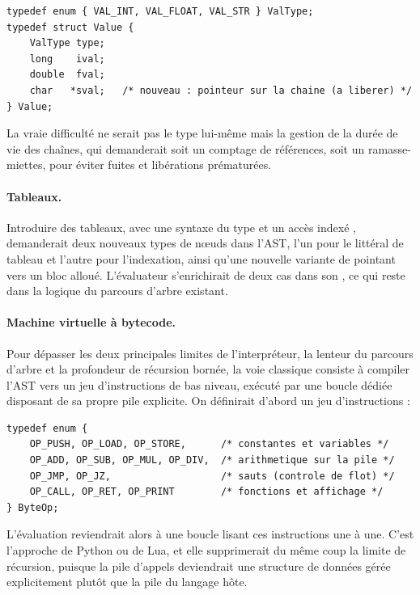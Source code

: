 \begin{lstlisting}[style=c,caption={Esquisse d'extension de \code{Value} aux chaînes.}]
typedef enum { VAL_INT, VAL_FLOAT, VAL_STR } ValType;
typedef struct Value {
    ValType type;
    long    ival;
    double  fval;
    char   *sval;   /* nouveau : pointeur sur la chaine (a liberer) */
} Value;
\end{lstlisting}

La vraie difficulté ne serait pas le type lui-même mais la gestion de la durée de
vie des chaînes, qui demanderait soit un comptage de références, soit un
ramasse-miettes, pour éviter fuites et libérations prématurées.

\paragraph{Tableaux.} Introduire des tableaux, avec une syntaxe du type
 et un accès indexé , demanderait deux nouveaux
types de n\oe uds dans l'AST, l'un pour le littéral de tableau et l'autre pour
l'indexation, ainsi qu'une nouvelle variante de  pointant vers un bloc
alloué. L'évaluateur s'enrichirait de deux cas dans son , ce qui
reste dans la logique du parcours d'arbre existant.

\paragraph{Machine virtuelle à bytecode.} Pour dépasser les deux principales
limites de l'interpréteur, la lenteur du parcours d'arbre et la profondeur de
récursion bornée, la voie classique consiste à compiler l'AST vers un jeu
d'instructions de bas niveau, exécuté par une boucle dédiée disposant de sa propre
pile explicite. On définirait d'abord un jeu d'instructions :

\begin{lstlisting}[style=c,caption={Esquisse d'un jeu d'instructions de bytecode.}]
typedef enum {
    OP_PUSH, OP_LOAD, OP_STORE,      /* constantes et variables */
    OP_ADD, OP_SUB, OP_MUL, OP_DIV,  /* arithmetique sur la pile */
    OP_JMP, OP_JZ,                   /* sauts (controle de flot) */
    OP_CALL, OP_RET, OP_PRINT        /* fonctions et affichage */
} ByteOp;
\end{lstlisting}

L'évaluation reviendrait alors à une boucle lisant ces instructions une à une.
C'est l'approche de Python ou de Lua, et elle supprimerait du même coup la limite
de récursion, puisque la pile d'appels deviendrait une structure de données gérée
explicitement plutôt que la pile du langage hôte.

